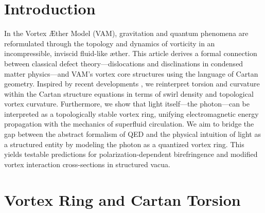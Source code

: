 \section{Introduction}\label{sec:introduction}
    In the Vortex \AE ther Model (VAM), gravitation and quantum phenomena are reformulated through the topology and dynamics of vorticity in an incompressible, inviscid fluid-like \ae ther. This article derives a formal connection between classical defect theory---dislocations and disclinations in condensed matter physics---and VAM's vortex core structures using the language of Cartan geometry. Inspired by recent developments \cite{kobayashi2025}, we reinterpret torsion and curvature within the Cartan structure equations in terms of swirl density and topological vortex curvature. Furthermore, we show that light itself---the photon---can be interpreted as a topologically stable vortex ring, unifying electromagnetic energy propagation with the mechanics of superfluid circulation.
    We aim to bridge the gap between the abstract formalism of QED and the physical intuition of light as a structured entity by modeling the photon as a quantized vortex ring. This yields testable predictions for polarization-dependent birefringence and modified vortex interaction cross-sections in structured vacua.


\section{Vortex Ring and Cartan Torsion}

\begin{center}
\end{center}



